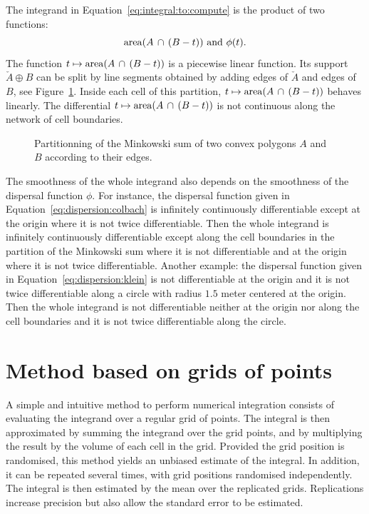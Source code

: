 The integrand in Equation~\eqref{eq:integral:to:compute} is the
product of two functions:
\begin{equation*}
  \mathrm{area}(A\,\cap\,(B-t)) \text{ and } \phi(t).
\end{equation*}
The function $t\mapsto\mathrm{area}(A\,\cap\,(B-t))$ is a piecewise linear
function. Its support $\check{A}\oplus B$ can be split by line
segments obtained by adding edges of $\check{A}$ and edges of $B$, see
Figure~\ref{fig:partition:minkowski}. Inside each cell of this
partition, $t\mapsto\mathrm{area}(A\,\cap\,(B-t))$ behaves linearly. The
differential $t\mapsto\mathrm{area}(A\,\cap\,(B-t))$ is not continuous along
the network of cell boundaries.
\begin{figure}[htbp]
  \centering
  
  \caption{Partitionning of the Minkowski sum of two convex polygons
    $A$ and $B$ according to their edges.}
  \label{fig:partition:minkowski}
\end{figure}

The smoothness of the whole integrand also depends on the smoothness
of the dispersal function $\phi$. For instance, the dispersal
function given in Equation~\eqref{eq:dispersion:colbach} is infinitely
continuously differentiable except at the origin where it is not twice
differentiable.  Then the whole integrand is infinitely continuously
differentiable except along the cell boundaries in the partition of
the Minkowski sum where it is not differentiable and at the origin
where it is not twice differentiable. Another example: the dispersal
function given in Equation~\eqref{eq:dispersion:klein} is not
differentiable at the origin and it is not twice differentiable along
a circle with radius $1.5$ meter centered at the origin. Then the
whole integrand is not differentiable neither at the origin nor along
the cell boundaries and it is not twice differentiable along the circle.


\section{Method based on grids of points}
\label{sec:integration:autres}

A simple and intuitive method to perform numerical integration consists
of evaluating the integrand over a regular grid of points. The integral
is then approximated by summing the integrand over the grid points, and
by multiplying the result by the volume of each cell in the grid.
Provided the grid position is randomised, this method yields an unbiased
estimate of the integral. In addition, it can be repeated
several times, with grid positions randomised independently. The
integral is then estimated by the mean over the replicated grids. Replications
increase precision but also allow the standard error to be estimated. 

